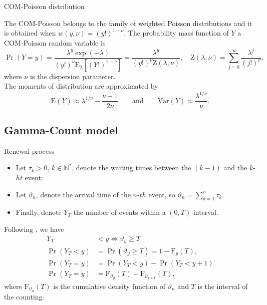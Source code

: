 \documentclass[11pt]{beamer}\usepackage[]{graphicx}\usepackage[]{color}
\begin{document}
\begin{frame}{COM-Poisson distribution}

  The COM-Poisson \citep{Shmueli2005} belongs to the family of weighted
  Poisson distributions and it is obtained when
  $w(y,\nu) = (y!)^{1-\nu}$. The probability mass function of $Y$ a
  COM-Poisson random variable is
  \begin{equation*}
    \label{eqn:pmf-compoisson}
    \Pr(Y = y) = \frac{\lambda^y \exp(-\lambda)}{
      (y!)^\nu \text{E}_\lambda[(Y!)^{1-\nu}]} =
    \frac{\lambda^y}{(y!)^\nu \text{Z}(\lambda, \nu)}, \quad
    \text{Z}(\lambda,\nu) = \sum_{j=0}^\infty \frac{\lambda^j}{(j!)^\nu},
  \end{equation*}
  where $\nu$ is the dispersion parameter. \\[0.5cm]

  The moments of distribution are approximated by
  $$
  \text{E}(Y) \approx \lambda^{1/\nu} - \frac{\nu - 1}{2\nu} \qquad
  \textrm{and} \qquad
  \text{Var}(Y) \approx \frac{\lambda^{1/\nu}}{\nu}.
  $$
\end{frame}

\subsection{Gamma-Count model}

\begin{frame}{Renewal process}

  \begin{itemize}
  \item Let $\tau_k>0,\, k\in\mathbb{N}^*$, denote the waiting times
    between the $(k-1)$ and the $k$-$ht$ event;
  \item Let $\vartheta_n$, denote the arrival time of the $n$-$th$
    event, so $\vartheta_n = \sum_{k=1}^n \tau_k$.
  \item Finally, denote $Y_T$ the number of events within a $(0, T)$
    interval.
  \end{itemize}
  Following \citet{Winkelmann1995}, we have
  $$
    \begin{aligned}
      Y_T &< y \iff \vartheta_y \geq T \\
      \Pr(Y_T < y) &= \Pr(\vartheta_y \geq T) = 1 - \text{F}_y(T), \\
      \Pr(Y_T = y) &= \Pr(Y_T < y) - \Pr(Y_T < y + 1) \\
      \Pr(Y_T = y) &= \text{F}_{\vartheta_y}(T) -
      \text{F}_{\vartheta_{y+1}}(T),
    \end{aligned}
  $$
  where $\text{F}_{\vartheta_n}(T)$ is the cumulative density function
  of $\vartheta_n$ and $T$ is the interval of the counting.
\end{frame}
\end{document}
